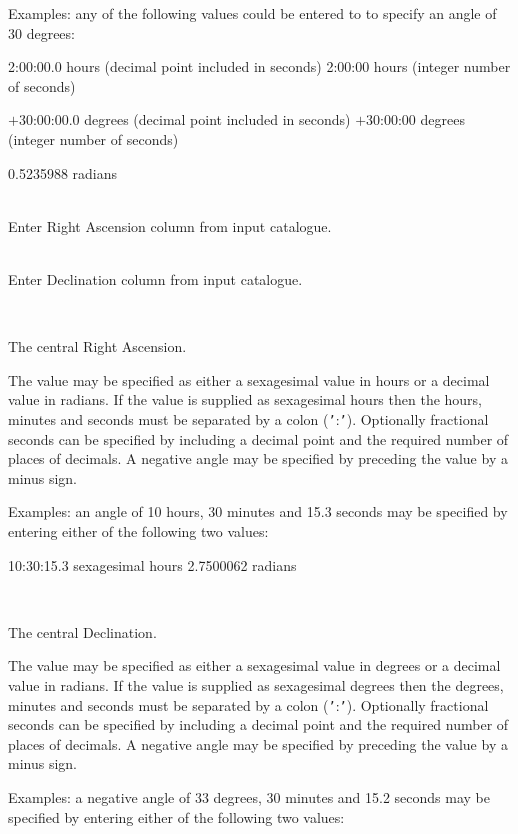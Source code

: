 \documentclass[twoside,11pt]{article}
\renewcommand{\_}{\texttt{\symbol{95}}}
\newcommand{\sstsubsection}[1]{ \item[{#1}] \mbox{} \\}
\newcommand{\sstsubsection}[1]{\item[{#1}]}
\begin{document}
\begin{htmlonly}
{{{         Examples: any of the following values could be entered to
         to specify an angle of 30 degrees:

             2:00:00.0   hours (decimal point included in seconds)
             2:00:00     hours (integer number of seconds)

           $+$30:00:00.0   degrees (decimal point included in seconds)
           $+$30:00:00     degrees (integer number of seconds)

             0.5235988   radians
      }
      \sstsubsection{
         RACOL  =  CHARACTER (read)
      }{
         Enter Right Ascension column from input catalogue.
      }
      \sstsubsection{
         DCCOL  =  CHARACTER (read)
      }{
         Enter Declination column from input catalogue.
      }
      \sstsubsection{
         RACEN  =  CHARACTER (read)
      }{
         The central Right Ascension.

         The value may be specified as either a sexagesimal value in
         hours or a decimal value in radians.  If the value is supplied
         as sexagesimal hours then the hours, minutes and seconds must
         be separated by a colon ({\tt '}:{\tt '}).  Optionally fractional
         seconds can be specified by including a decimal point and the
         required number of places of decimals.  A negative angle may
         be specified by preceding the value by a minus sign.

         Examples: an angle of 10 hours, 30 minutes and 15.3 seconds
         may be specified by entering either of the following two
         values:

             10:30:15.3     sexagesimal hours
             2.7500062      radians
      }
      \sstsubsection{
         DCCEN  =  CHARACTER (read)
      }{
         The central Declination.

         The value may be specified as either a sexagesimal value in
         degrees or a decimal value in radians.  If the value is supplied
         as sexagesimal degrees then the degrees, minutes and seconds must
         be separated by a colon ({\tt '}:{\tt '}).  Optionally fractional
         seconds can be specified by including a decimal point and the
         required number of places of decimals.  A negative angle may
         be specified by preceding the value by a minus sign.

         Examples: a negative angle of 33 degrees, 30 minutes and 15.2
         seconds may be specified by entering either of the following two
         values:

}}}
\end{htmlonly}
\end{document}
